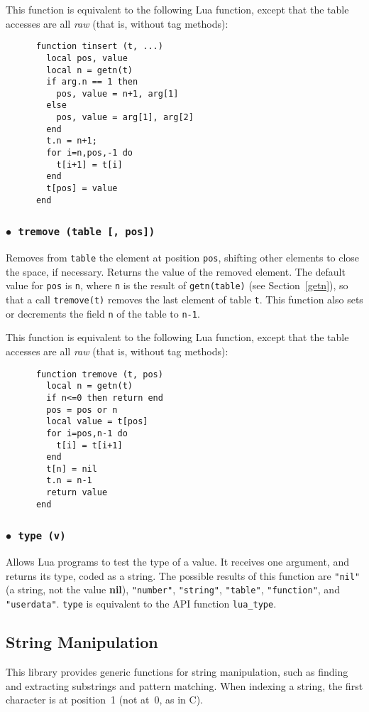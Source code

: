 \documentclass[11pt]{article}
\newcommand{\See}[1]{Section~\ref{#1}}
\newcommand{\see}[1]{(see \See{#1})}
\newcommand{\T}[1]{{\tt #1}}
\newcommand{\nil}{{\bf nil}}
\newcommand{\Deffunc}[1]{\index{#1}}
\newcommand{\ff}{$\bullet$\ }
\begin{document}
This function is equivalent to the following Lua function,
except that the table accesses are all \emph{raw} (that is, without tag methods):
\begin{verbatim}
      function tinsert (t, ...)
        local pos, value
        local n = getn(t)
        if arg.n == 1 then
          pos, value = n+1, arg[1]
        else
          pos, value = arg[1], arg[2]
        end
        t.n = n+1;
        for i=n,pos,-1 do
          t[i+1] = t[i]
        end
        t[pos] = value
      end
\end{verbatim}

\subsubsection*{\ff \T{tremove (table [, pos])}}\Deffunc{tremove}

Removes from \verb|table| the element at position \verb|pos|,
shifting other elements to close the space, if necessary.
Returns the value of the removed element.
The default value for \verb|pos| is \verb|n|,
where \verb|n| is the result of \verb|getn(table)| \see{getn},
so that a call \verb|tremove(t)| removes the last element
of table \verb|t|.
This function also sets or decrements the field \verb|n| of the table
to \verb|n-1|.

This function is equivalent to the following Lua function,
except that the table accesses are all \emph{raw} (that is, without tag methods):
\begin{verbatim}
      function tremove (t, pos)
        local n = getn(t)
        if n<=0 then return end
        pos = pos or n
        local value = t[pos]
        for i=pos,n-1 do
          t[i] = t[i+1]
        end
        t[n] = nil
        t.n = n-1
        return value
      end
\end{verbatim}

\subsubsection*{\ff \T{type (v)}}\Deffunc{type}\label{pdf-type}
Allows Lua programs to test the type of a value.
It receives one argument, and returns its type, coded as a string.
The possible results of this function are
\verb|"nil"| (a string, not the value \nil),
\verb|"number"|,
\verb|"string"|,
\verb|"table"|,
\verb|"function"|,
and \verb|"userdata"|.
\verb|type| is equivalent to the API function \verb|lua_type|.


\subsection{String Manipulation}
This library provides generic functions for string manipulation,
such as finding and extracting substrings and pattern matching.
When indexing a string, the first character is at position~1
(not at~0, as in C).
\end{document}
